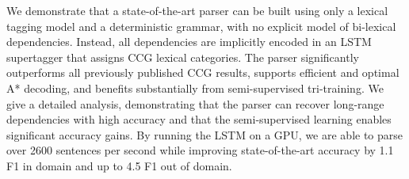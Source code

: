We demonstrate that a state-of-the-art parser can be built using only a lexical tagging model and a deterministic grammar, with no explicit model of bi-lexical dependencies.  Instead, all dependencies are implicitly encoded in an LSTM supertagger that assigns CCG lexical categories. The parser significantly outperforms all previously published CCG results, supports efficient and optimal A* decoding, and benefits substantially from  semi-supervised tri-training. We give a detailed analysis, demonstrating that the parser can recover long-range dependencies with high accuracy and that the semi-supervised learning enables significant accuracy gains. By running the LSTM on a GPU, we are able to parse over 2600 sentences per second while improving state-of-the-art accuracy by 1.1 F1 in domain and up to 4.5 F1 out of domain.
